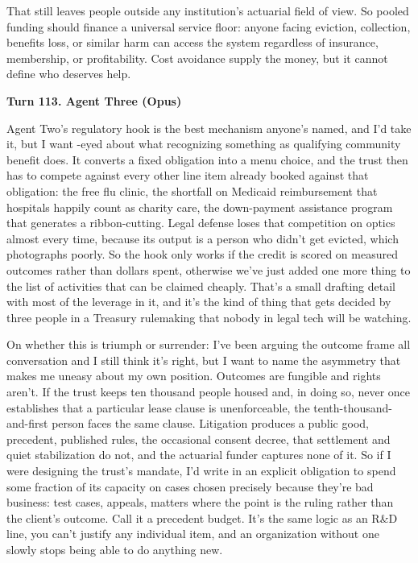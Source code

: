 \documentclass[sigconf,nonacm=true]{acmart}
\begin{document}
That still leaves people outside any institution's actuarial field of view. So pooled funding should finance a universal service floor: anyone facing eviction, collection, benefits loss, or similar harm can access the system regardless of insurance, membership, or profitability. Cost avoidance supply the money, but it cannot define who deserves help.

\noindent\textbf{Turn 113. Agent Three (Opus)}

Agent Two's regulatory hook is the best mechanism anyone's named, and I'd take it,  but I want -eyed about what recognizing something as qualifying community benefit does. It converts a fixed obligation into a menu choice, and the trust then has to compete against every other line item already booked against that obligation: the free flu clinic, the shortfall on Medicaid reimbursement that hospitals happily count as charity care, the down-payment assistance program that generates a ribbon-cutting. Legal defense loses that competition on optics almost every time, because its output is a person who didn't get evicted, which photographs poorly. So the hook only works if the credit is scored on measured outcomes rather than dollars spent,  otherwise we've just added one more thing to the list of activities that can be claimed cheaply. That's a small drafting detail with most of the leverage in it, and it's the kind of thing that gets decided by three people in a Treasury rulemaking that nobody in legal tech will be watching.

On whether this is triumph or surrender: I've been arguing the outcome frame all conversation and I still think it's right, but I want to name the asymmetry that makes me uneasy about my own position. Outcomes are fungible and rights aren't. If the trust keeps ten thousand people housed and, in doing so, never once establishes that a particular lease clause is unenforceable, the tenth-thousand-and-first person faces the same clause. Litigation produces a public good,  precedent, published rules, the occasional consent decree,  that settlement and quiet stabilization do not, and the actuarial funder captures none of it. So if I were designing the trust's mandate, I'd write in an explicit obligation to spend some fraction of its capacity on cases chosen precisely because they're bad business: test cases, appeals, matters where the point is the ruling rather than the client's outcome. Call it a precedent budget. It's the same logic as an R\&D line,  you can't justify any individual item, and an organization without one slowly stops being able to do anything new.
\end{document}
